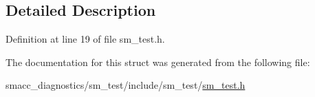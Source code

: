 \subsection{Detailed Description}


Definition at line 19 of file sm\+\_\+test.\+h.



The documentation for this struct was generated from the following file\+:\begin{DoxyCompactItemize}
\item 
smacc\+\_\+diagnostics/sm\+\_\+test/include/sm\+\_\+test/\hyperlink{sm__test_8h}{sm\+\_\+test.\+h}\end{DoxyCompactItemize}
